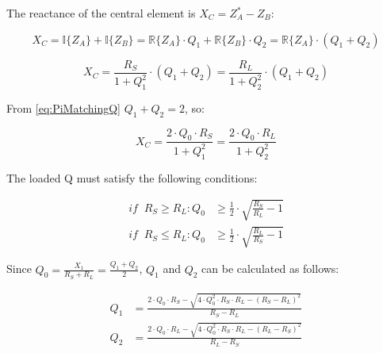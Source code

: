 \noindent The reactance of the central element is $X_C = Z_A^* - Z_B$:

\begin{equation}
X_C = \mathbb{I} \lbrace Z_A \rbrace + \mathbb{I} \lbrace Z_B \rbrace = \mathbb{R} \lbrace Z_A \rbrace  \cdot Q_1 + \mathbb{R} \lbrace Z_B \rbrace \cdot Q_2 = \mathbb{R} \lbrace Z_A \rbrace \cdot (Q_1 + Q_2)
\end{equation}

\begin{equation}
X_C = \frac{R_S}{1 + Q_1^2} \cdot (Q_1 + Q_2) = \frac{R_L}{1 + Q_2^2} \cdot (Q_1 + Q_2)
\end{equation}

\noindent From \ref{eq:PiMatchingQ} $Q_1 + Q_2 = 2$, so:

\begin{equation}
X_C = \frac{2 \cdot Q_0 \cdot R_S}{1 + Q_1^2} = \frac{2 \cdot Q_0 \cdot R_L}{1 + Q_2^2}
\end{equation}

\noindent The loaded Q must satisfy the following conditions:

\begin{align}
       if \;\; R_S \ge R_L:    Q_0 &\ge \frac{1}{2} \cdot \sqrt{\frac{R_S}{R_L} -1 }\\
       if \;\; R_S \le R_L:    Q_0 &\ge \frac{1}{2} \cdot \sqrt{\frac{R_L}{R_S} -1 }
\end{align}

\noindent Since $Q_0 = \frac{X_1}{R_S + R_L} = \frac{Q_1 + Q_2}{2}$, $Q_1$ and $Q_2$ can be calculated as follows:
 
\begin{align}
       Q_1 &= \frac{2 \cdot Q_0 \cdot R_S - \sqrt{4 \cdot Q_0^2 \cdot R_S \cdot R_L - (R_S - R_L)^2}}{R_S - R_L}\\
       Q_2 &= \frac{2 \cdot Q_0 \cdot R_L - \sqrt{4 \cdot Q_0^2 \cdot R_S \cdot R_L - (R_L - R_S)^2}}{R_L - R_S}
\end{align}

